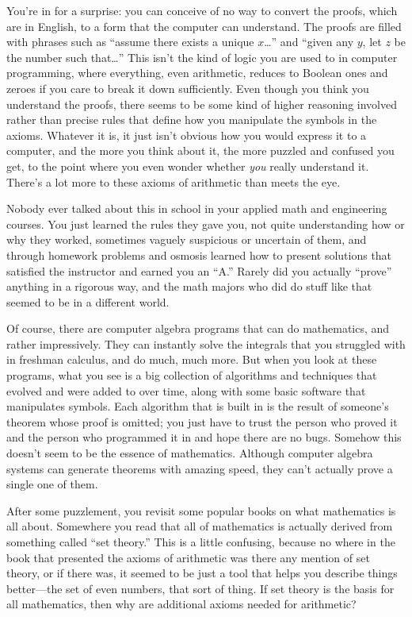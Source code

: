 You're in for a surprise:  you can conceive of no way to convert the
proofs, which are in English, to a form that the computer can understand.
The proofs are filled with phrases such as ``assume there exists a unique
$x$\ldots'' and ``given any $y$, let $z$ be the number such that\ldots''  This
isn't the kind of logic you are used to in computer programming, where
everything, even arithmetic, reduces to Boolean ones and zeroes if you care to
break it down sufficiently.  Even though you think you understand the proofs,
there seems to be some kind of higher reasoning involved rather than precise
rules that define how you manipulate the symbols in the axioms.  Whatever it
is, it just isn't obvious how you would express it to a computer, and the more
you think about it, the more puzzled and confused you get, to the point where
you even wonder whether {\em you} really understand it.  There's a lot more to
these axioms of arithmetic than meets the eye.

Nobody ever talked about this in school in your applied math and engineering
courses.  You just learned the rules they gave you, not quite understanding
how or why they worked, sometimes vaguely suspicious or uncertain of them, and
through homework problems and osmosis learned how to present solutions that
satisfied the instructor and earned you an ``A.''  Rarely did you actually
``prove'' anything in a rigorous way, and the math majors who did do stuff
like that seemed to be in a different world.

Of course, there are computer algebra programs that can do mathematics, and
rather impressively.  They can instantly solve the integrals that you
struggled with in freshman calculus, and do much, much more.  But when you
look at these programs, what you see is a big collection of algorithms and
techniques that evolved and were added to over time, along with some basic
software that manipulates symbols.  Each algorithm that is built in is the
result of someone's theorem whose proof is omitted; you just have to trust the
person who proved it and the person who programmed it in and hope there are no
bugs.  Somehow this doesn't seem to be the
essence of mathematics.  Although computer algebra systems can generate
theorems with amazing speed, they can't actually prove a single one of them.

After some puzzlement, you revisit some popular books on what mathematics is
all about.  Somewhere you read that all of mathematics is actually derived
from something called ``set theory.''  This is a little confusing, because no
where in the book that presented the axioms of arithmetic was there any
mention of set theory, or if there was, it seemed to be just a tool that helps
you describe things better---the set of even numbers, that sort of thing.  If
set theory is the basis for all mathematics, then why are additional axioms
needed for arithmetic?

